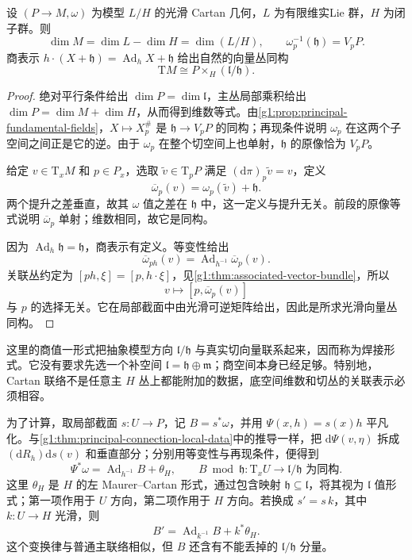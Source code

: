 \begin{proposition}\label{g1:prop:cartan-soldering}
	设 \((P\to M,\omega)\) 为模型 \(L/H\) 的光滑 Cartan 几何，\(L\) 为有限维实Lie 群，\(H\) 为闭子群。则
	\[
		\dim M=\dim L-\dim H=\dim(L/H),\qquad
		\omega_p^{-1}(\mathfrak h)=V_pP.
	\]
	商表示 \(h\cdot(X+\mathfrak h)=\operatorname{Ad}_hX+\mathfrak h\) 给出自然的向量丛同构
	\begin{equation}\label{g1:eq:cartan-soldering}
		\mathrm{T}M\cong P\times_H(\mathfrak l/\mathfrak h).
	\end{equation}
\end{proposition}
\begin{proof}
	绝对平行条件给出 \(\dim P=\dim\mathfrak l\)，主丛局部乘积给出 \(\dim P=\dim M+\dim H\)，从而得到维数等式。由\cref{g1:prop:principal-fundamental-fields}，\(X\mapsto X_p^\#\) 是 \(\mathfrak h\to V_pP\) 的同构；再现条件说明 \(\omega_p\) 在这两个子空间之间正是它的逆。由于 \(\omega_p\) 在整个切空间上也单射，\(\mathfrak h\) 的原像恰为 \(V_pP\)。

	给定 \(v\in\mathrm{T}_xM\) 和 \(p\in P_x\)，选取 \(\widetilde v\in\mathrm{T}_pP\) 满足 \((\mathrm{d}\pi)_p\widetilde v=v\)，定义
	\[
		\overline\omega_p(v)=\omega_p(\widetilde v)+\mathfrak h.
	\]
	两个提升之差垂直，故其 \(\omega\) 值之差在 \(\mathfrak h\) 中，这一定义与提升无关。前段的原像等式说明 \(\overline\omega_p\) 单射；维数相同，故它是同构。

	因为 \(\operatorname{Ad}_h\mathfrak h=\mathfrak h\)，商表示有定义。等变性给出
	\[
		\overline\omega_{ph}(v)
		=\operatorname{Ad}_{h^{-1}}\overline\omega_p(v).
	\]
	关联丛约定为 \([ph,\xi]=[p,h\cdot\xi]\)，见\cref{g1:thm:associated-vector-bundle}，所以
	\[
		v\longmapsto[p,\overline\omega_p(v)]
	\]
	与 \(p\) 的选择无关。它在局部截面中由光滑可逆矩阵给出，因此是所求光滑向量丛同构。
\end{proof}

这里的商值一形式把抽象模型方向 \(\mathfrak l/\mathfrak h\) 与真实切向量联系起来，因而称为焊接形式。它没有要求先选一个补空间 \(\mathfrak l=\mathfrak h\oplus\mathfrak m\)；商空间本身已经足够。特别地，Cartan 联络不是任意主 \(H\) 丛上都能附加的数据，底空间维数和切丛的关联表示必须相容。

\ProseParagraphBreak

为了计算，取局部截面 \(s:U\to P\)，记 \(B=s^*\omega\)，并用 \(\Psi(x,h)=s(x)h\) 平凡化。与\cref{g1:thm:principal-connection-local-data}中的推导一样，把 \(\mathrm{d}\Psi(v,\eta)\) 拆成 \((\mathrm{d}R_h)\mathrm{d}s(v)\) 和垂直部分；分别用等变性与再现条件，便得到
\begin{equation}\label{g1:eq:cartan-local-form}
	\Psi^*\omega
	=\operatorname{Ad}_{h^{-1}}B+\theta_H,
	\qquad
	B\bmod\mathfrak h:
	\mathrm{T}_xU\longrightarrow\mathfrak l/\mathfrak h
	\text{ 为同构}.
\end{equation}
这里 \(\theta_H\) 是 \(H\) 的左 Maurer--Cartan 形式，通过包含映射 \(\mathfrak h\subseteq\mathfrak l\)，将其视为 \(\mathfrak l\) 值形式；第一项作用于 \(U\) 方向，第二项作用于 \(H\) 方向。若换成 \(s'=s\,k\)，其中 \(k:U\to H\) 光滑，则
\[
	B'=\operatorname{Ad}_{k^{-1}}B+k^*\theta_H.
\]
这个变换律与普通主联络相似，但 \(B\) 还含有不能丢掉的 \(\mathfrak l/\mathfrak h\) 分量。

